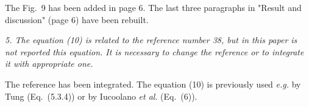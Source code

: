 \documentclass[aip,jap,preprint]{revtex4-1}
\begin{document}
The Fig.~9 has been added in page 6.
The last three paragraphs in "Result and discussion" (page 6) have been rebuilt.

\vspace{1cm}
\emph{5. The equation (10) is related to the reference number 38, but in this paper is not reported this equation. It is necessary to change the reference or to integrate it with appropriate one.}

The reference has been integrated.
The equation (10) is previously used \emph{e.g.} by Tung\cite{Tung:MSE} (Eq.~(5.3.4)) or by Iucoolano \emph{et al}.\cite{Iucolano2007JAP} (Eq.~(6)).




\end{document}
